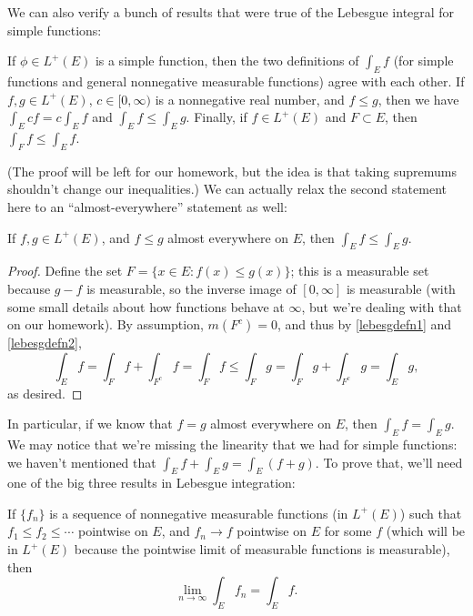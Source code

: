 We can also verify a bunch of results that were true of the Lebesgue integral for simple functions:

\begin{proposition}\label{lebesgdefn2}
If $\phi \in L^+(E)$ is a simple function, then the two definitions of $\int_E f$ (for simple functions and general nonnegative measurable functions) agree with each other. If $f, g \in L^+(E)$, $c \in [0, \infty)$ is a nonnegative real number, and $f \le g$, then we have $\int_E cf = c \int_E f$ and $\int_E f \le \int_E g$. Finally, if $f \in L^+(E)$ and $F \subset E$, then $\int_F f \le \int_E f$.
\end{proposition}

(The proof will be left for our homework, but the idea is that taking supremums shouldn't change our inequalities.) We can actually relax the second statement here to an ``almost-everywhere'' statement as well:

\begin{proposition}
If $f, g \in L^+(E)$, and $f \le g$ almost everywhere on $E$, then $\int_E f \le \int_E g$.
\end{proposition}
\begin{proof}
Define the set $F = \{x \in E: f(x) \le g(x)\}$; this is a measurable set because $g - f$ is measurable, so the inverse image of $[0, \infty]$ is measurable (with some small details about how functions behave at $\infty$, but we're dealing with that on our homework). By assumption, $m(F^c) = 0$, and thus by \cref{lebesgdefn1} and \cref{lebesgdefn2},
\[
    \int_E f = \int_{F} f + \int_{F^c} f = \int_F f \le \int_F g = \int_F g + \int_{F^c} g = \int_E g,
\]
as desired.
\end{proof}

In particular, if we know that $f = g$ almost everywhere on $E$, then $\int_E f = \int_E g$. We may notice that we're missing the linearity that we had for simple functions: we haven't mentioned that $\int_E f + \int_E g = \int_E (f+g)$. To prove that, we'll need one of the big three results in Lebesgue integration:

\begin{theorem}\label{monotone}
If $\{f_n\}$ is a sequence of nonnegative measurable functions (in $L^+(E)$) such that $f_1 \le f_2 \le \cdots$ pointwise on $E$, and $f_n \to f$ pointwise on $E$ for some $f$ (which will be in $L^+(E)$ because the pointwise limit of measurable functions is measurable), then 
\[
    \lim_{n \to \infty} \int_E f_n = \int_E f.
\]
\end{theorem}


